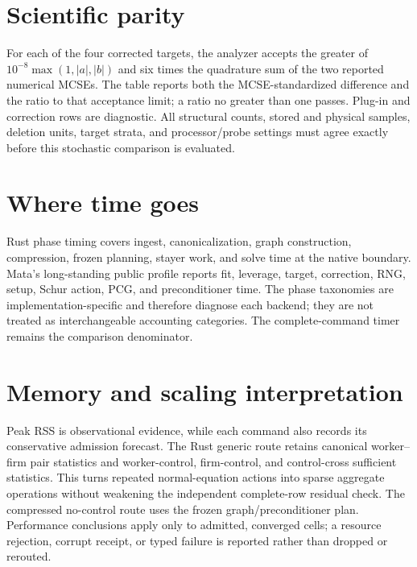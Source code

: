 \documentclass[11pt]{article}
\begin{document}
\section{Scientific parity}

\begin{center}
\small

\end{center}

For each of the four corrected targets, the analyzer accepts the greater of
\(10^{-8}\max(1,|a|,|b|)\) and six times the quadrature sum of the two reported
numerical MCSEs.  The table reports both the MCSE-standardized difference and
the ratio to that acceptance limit; a ratio no greater than one passes.
Plug-in and correction rows are diagnostic.  All structural counts, stored
and physical samples, deletion units, target strata, and processor/probe
settings must agree exactly before this stochastic comparison is evaluated.

\section{Where time goes}

\begin{center}
\small

\end{center}

Rust phase timing covers ingest, canonicalization, graph construction,
compression, frozen planning, stayer work, and solve time at the native
boundary.  Mata's long-standing public profile reports fit, leverage, target,
correction, RNG, setup, Schur action, PCG, and preconditioner time.  The phase
taxonomies are implementation-specific and therefore diagnose each backend;
they are not treated as interchangeable accounting categories.  The
complete-command timer remains the comparison denominator.

\section{Memory and scaling interpretation}

Peak RSS is observational evidence, while each command also records its
conservative admission forecast.  The Rust generic route retains canonical
worker--firm pair statistics and worker-control, firm-control, and
control-cross sufficient statistics.  This turns repeated normal-equation
actions into sparse aggregate operations without weakening the independent
complete-row residual check.  The compressed no-control route uses the frozen
graph/preconditioner plan.  Performance conclusions apply only to admitted,
converged cells; a resource rejection, corrupt receipt, or typed failure is
reported rather than dropped or rerouted.
\end{document}
